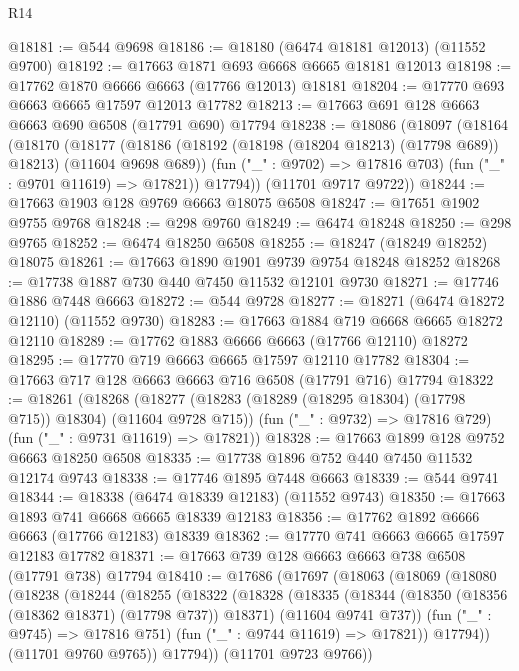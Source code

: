 \begin{lexlean}{R14}
\begin{coremodule}
@18181 := @544 @9698
@18186 := @18180 (@6474 @18181 @12013) (@11552 @9700)
@18192 := @17663 @1871 @693 @6668 @6665 @18181 @12013
@18198 := @17762 @1870 @6666 @6663 (@17766 @12013) @18181
@18204 := @17770 @693 @6663 @6665 @17597 @12013 @17782
@18213 := @17663 @691 @128 @6663 @6663 @690 @6508 (@17791 @690) @17794
@18238 := @18086
    (@18097
      (@18164
        (@18170
          (@18177
            (@18186 (@18192 (@18198 (@18204 @18213) (@17798 @689)) @18213) (@11604 @9698 @689))
            (fun ("_" : @9702) => @17816 @703)
            (fun ("_" : @9701 @11619) => @17821))
          @17794))
      (@11701 @9717 @9722))
@18244 := @17663 @1903 @128 @9769 @6663 @18075 @6508
@18247 := @17651 @1902 @9755 @9768
@18248 := @298 @9760
@18249 := @6474 @18248
@18250 := @298 @9765
@18252 := @6474 @18250 @6508
@18255 := @18247 (@18249 @18252) @18075
@18261 := @17663 @1890 @1901 @9739 @9754 @18248 @18252
@18268 := @17738 @1887 @730 @440 @7450 @11532 @12101 @9730
@18271 := @17746 @1886 @7448 @6663
@18272 := @544 @9728
@18277 := @18271 (@6474 @18272 @12110) (@11552 @9730)
@18283 := @17663 @1884 @719 @6668 @6665 @18272 @12110
@18289 := @17762 @1883 @6666 @6663 (@17766 @12110) @18272
@18295 := @17770 @719 @6663 @6665 @17597 @12110 @17782
@18304 := @17663 @717 @128 @6663 @6663 @716 @6508 (@17791 @716) @17794
@18322 := @18261
    (@18268
      (@18277 (@18283 (@18289 (@18295 @18304) (@17798 @715)) @18304) (@11604 @9728 @715))
      (fun ("_" : @9732) => @17816 @729)
      (fun ("_" : @9731 @11619) => @17821))
@18328 := @17663 @1899 @128 @9752 @6663 @18250 @6508
@18335 := @17738 @1896 @752 @440 @7450 @11532 @12174 @9743
@18338 := @17746 @1895 @7448 @6663
@18339 := @544 @9741
@18344 := @18338 (@6474 @18339 @12183) (@11552 @9743)
@18350 := @17663 @1893 @741 @6668 @6665 @18339 @12183
@18356 := @17762 @1892 @6666 @6663 (@17766 @12183) @18339
@18362 := @17770 @741 @6663 @6665 @17597 @12183 @17782
@18371 := @17663 @739 @128 @6663 @6663 @738 @6508 (@17791 @738) @17794
@18410 := @17686
    (@17697
      (@18063
        (@18069
          (@18080
            (@18238
              (@18244
                (@18255
                  (@18322
                    (@18328
                      (@18335
                        (@18344
                          (@18350 (@18356 (@18362 @18371) (@17798 @737)) @18371)
                          (@11604 @9741 @737))
                        (fun ("_" : @9745) => @17816 @751)
                        (fun ("_" : @9744 @11619) => @17821))
                      @17794))
                  (@11701 @9760 @9765))
                @17794))
            (@11701 @9723 @9766))

\end{coremodule}
\end{lexlean}
